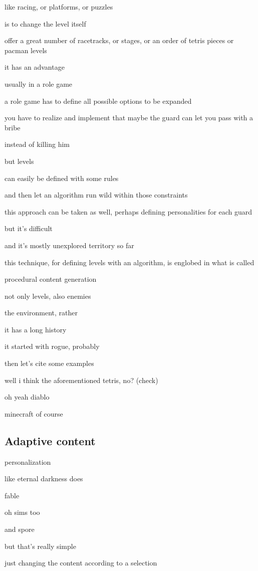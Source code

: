 like racing, or platforms, or puzzles

is to change the level itself

offer a great number of racetracks, or stages, or an order of tetris pieces or pacman levels

it has an advantage

usually in a role game

a role game has to define all possible options to be expanded

you have to realize and implement that maybe the guard can let you pass with a bribe

instead of killing him

but levels

can easily be defined with some rules

and then let an algorithm run wild within those constraints

this approach can be taken as well, perhaps defining personalities for each guard

but it's difficult

and it's mostly unexplored territory so far

this technique, for defining levels with an algorithm, is englobed in what is called

procedural content generation

not only levels, also enemies

the environment, rather

it has a long history

it started with rogue, probably

then let's cite some examples

well i think the aforementioned tetris, no? (check)

oh yeah diablo

minecraft of course


\subsection{Adaptive content}

personalization

like eternal darkness does


fable

oh sims too

and spore


but that's really simple

just changing the content according to a selection

